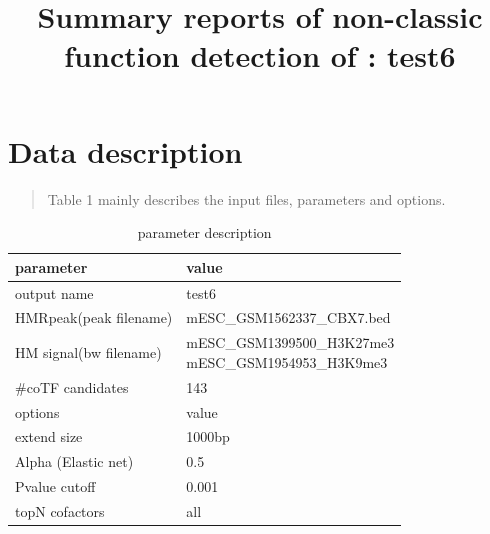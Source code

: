 \documentclass[11pt,a4paper]{article}
\begin{document}
\title{Summary reports of non-classic function detection of : test6}

\vspace{-1cm}
\maketitle
\tableofcontents
\newpage
\newpage
\section{Data description}
\begin{quotation}
Table 1 mainly describes the input files, parameters and options.
\end{quotation}
\begin{table}[h]
\caption{parameter description}\label{bstable}
\begin{tabularx}{\textwidth}{ |X|l| }

      
\hline
parameter & value  \\
\hline
output name & test6 \\
\hline
HMRpeak(peak filename) & mESC\_GSM1562337\_CBX7.bed \\
\hline
HM signal(bw filename) & \makecell{mESC\_GSM1399500\_H3K27me3\\mESC\_GSM1954953\_H3K9me3}  \\
\hline
\#coTF candidates & 143 \\
\hline
options & value \\
\hline
extend size & 1000bp \\
\hline
Alpha (Elastic net) & 0.5 \\
\hline
Pvalue cutoff & 0.001 \\
\hline
topN cofactors & all \\
\hline

\end{tabularx}
\end{table}

\newpage
\newpage
\end{document}
